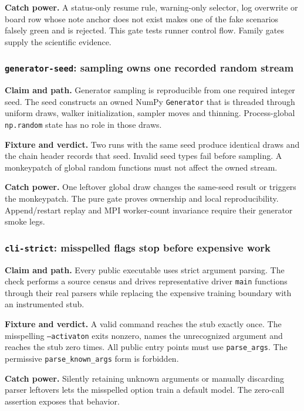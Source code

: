 \documentclass[10pt,aps,prd,twocolumn,nofootinbib]{revtex4-2}
\newcommand{\code}[1]{\texttt{#1}}
\begin{document}
\textbf{Catch power.}  A status-only resume rule, warning-only selector, log
overwrite or board row whose note anchor does not exist makes one of the
fake scenarios falsely green and is rejected.  This gate tests runner control
flow.  Family gates supply the scientific evidence.

\subsubsection{\code{generator-seed}: sampling owns one recorded random stream}

\textbf{Claim and path.}  Generator sampling is reproducible from one required
integer seed.  The seed constructs an owned NumPy \code{Generator} that is
threaded through uniform draws, walker initialization, sampler moves and
thinning.  Process-global \code{np.random} state has no role in those draws.

\textbf{Fixture and verdict.}  Two runs with the same seed produce identical
draws and the chain header records that seed.  Invalid seed types fail before
sampling.  A monkeypatch of global random functions must not affect the owned
stream.

\textbf{Catch power.}  One leftover global draw changes the same-seed result
or triggers the monkeypatch.  The pure gate proves ownership and local
reproducibility.  Append/restart replay and MPI worker-count invariance require
their generator smoke legs.

\subsubsection{\code{cli-strict}: misspelled flags stop before expensive work}

\textbf{Claim and path.}  Every public executable uses strict argument
parsing.  The check performs a source census and drives representative driver
\code{main} functions through their real parsers while replacing the
expensive training boundary with an instrumented stub.

\textbf{Fixture and verdict.}  A valid command reaches the stub exactly once.
The misspelling \code{--activaton} exits nonzero, names the unrecognized
argument and reaches the stub zero times.  All public entry points must use
\code{parse\_args}.  The permissive \code{parse\_known\_args} form is forbidden.

\textbf{Catch power.}  Silently retaining unknown arguments or manually
discarding parser leftovers lets the misspelled option train a default model.
The zero-call assertion exposes that behavior.
\end{document}
